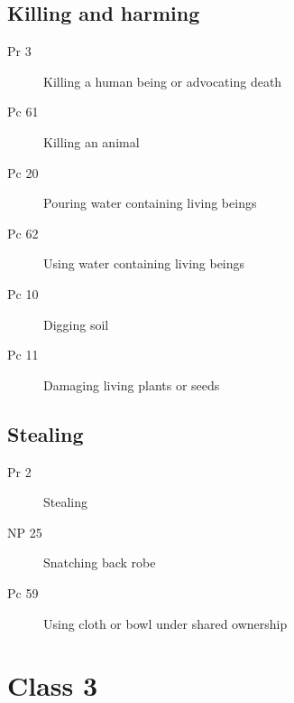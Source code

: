 \documentclass[11pt,oneside]{memoir}
\begin{document}
\begin{multicols}{2}

\section{Killing and harming}

\begin{description}
\item[Pr 3 \orig] Killing a human being or advocating death
\item[Pc 61 \orig] Killing an animal
\item[Pc 20] Pouring water containing living beings
\item[Pc 62] Using water containing living beings
\item[Pc 10] Digging soil
\item[Pc 11 \orig] Damaging living plants or seeds%
\end{description}

\columnbreak

\section{Stealing}

\begin{description}
\item[Pr 2 \orig] Stealing
\item[NP 25 \orig] Snatching back robe%
\item[Pc 59] Using cloth or bowl under shared ownership
\end{description}

\end{multicols}

\chapter{Class 3}
\end{document}

